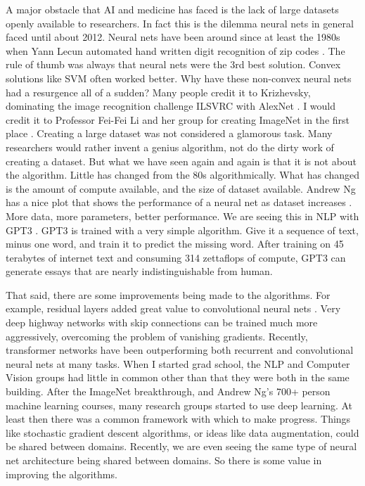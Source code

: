 A major obstacle that AI and medicine has faced is the lack of large datasets openly available to researchers.  In fact this is the dilemma neural nets in general faced until about 2012.  Neural nets have been around since at least the 1980s when Yann Lecun automated hand written digit recognition of zip codes \cite{lecun1989backpropagation}.  The rule of thumb was always that neural nets were the 3rd best solution.  Convex solutions like SVM often worked better.  Why have these non-convex neural nets had a resurgence all of a sudden?  Many people credit it to Krizhevsky, dominating the image recognition challenge ILSVRC with AlexNet \cite{krizhevsky2012imagenet}.  I would credit it to Professor Fei-Fei Li and her group for creating ImageNet in the first place \cite{deng2009imagenet}.  Creating a large dataset was not considered a glamorous task.  Many researchers would rather invent a genius algorithm, not do the dirty work of creating a dataset.  But what we have seen again and again is that it is not about the algorithm.  Little has changed from the 80s algorithmically.  What has changed is the amount of compute available, and the size of dataset available.  Andrew Ng has a nice plot that shows the performance of a neural net as dataset increases \cite{ng2016nuts}.  More data, more parameters, better performance.  We are seeing this in NLP with GPT3 \cite{brown2020language}.  GPT3 is trained with a very simple algorithm.  Give it a sequence of text, minus one word, and train it to predict the missing word.  After training on 45 terabytes of internet text and consuming 314 zettaflops of compute, GPT3 can generate essays that are nearly indistinguishable from human.

That said, there are some improvements being made to the algorithms.  For example, residual layers added great value to convolutional neural nets \cite{he2016deep}.  Very deep highway networks with skip connections can be trained much more aggressively, overcoming the problem of vanishing gradients.  Recently, transformer networks have been outperforming both recurrent and convolutional neural nets at many tasks.  When I started grad school, the NLP and Computer Vision groups had little in common other than that they were both in the same building.  After the ImageNet breakthrough, and Andrew Ng's 700+ person machine learning courses, many research groups started to use deep learning.  At least then there was a common framework with which to make progress.  Things like stochastic gradient descent algorithms, or ideas like data augmentation, could be shared between domains.  Recently, we are even seeing the same type of neural net architecture being shared between domains.  So there is some value in improving the algorithms.  


